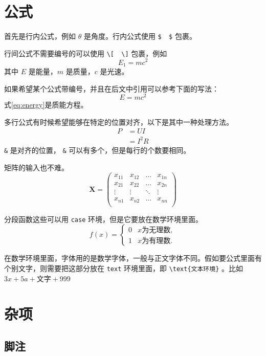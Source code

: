 \newpage

\section{公式}

首先是行内公式，例如 $ \theta $ 是角度。行内公式使用 \verb|$  $| 包裹。

行间公式不需要编号的可以使用 \verb|\[  \]| 包裹，例如
\[
E_1=mc^2
\]
其中 $ E $ 是能量，$ m $ 是质量，$ c $ 是光速。

如果希望某个公式带编号，并且在后文中引用可以参考下面的写法：
\begin{equation}
	E=mc^2
	\label{eq:energy}
\end{equation}
式\ref{eq:energy}是质能方程。


多行公式有时候希望能够在特定的位置对齐，以下是其中一种处理方法。
\begin{align}
	P & = UI \\
	& = I^2R
\end{align}
\verb|&| 是对齐的位置， \verb|&| 可以有多个，但是每行的个数要相同。

矩阵的输入也不难。
\[
\mathbf{X} = \left(
\begin{array}{cccc}
	x_{11} & x_{12} & \ldots & x_{1n}\\
	x_{21} & x_{22} & \ldots & x_{2n}\\
	\vdots & \vdots & \ddots & \vdots\\
	x_{n1} & x_{n2} & \ldots & x_{nn}\\
\end{array} \right)
\]

分段函数这些可以用 \verb|case| 环境，但是它要放在数学环境里面。
\[
f(x) =
\begin{cases}
	0 &  x \text{为无理数} ,\\
	1 &  x \text{为有理数} .
\end{cases}
\]

在数学环境里面，字体用的是数学字体，一般与正文字体不同。假如要公式里面有个别文字，则需要把这部分放在 \verb|text| 环境里面，即 \verb|\text{文本环境}| 。比如$3x+5a+\text{文字}+999$

\newpage

\section{杂项}

\subsection{脚注}

